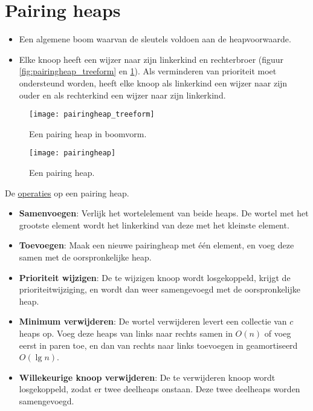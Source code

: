 \section{Pairing heaps}
		\begin{itemize}
			\item Een algemene boom waarvan de sleutels voldoen aan de heapvoorwaarde.
			\item Elke knoop heeft een wijzer naar zijn linkerkind en rechterbroer (figuur \ref{fig:pairingheap_treeform} en \ref{fig:pairingheap}). Als verminderen van prioriteit moet ondersteund worden, heeft elke knoop als linkerkind een wijzer naar zijn ouder en als rechterkind een wijzer naar zijn linkerkind.
		\end{itemize}
		\begin{figure}[ht]
			\centering
			\begin{minipage}{.5\textwidth}
				\centering
				\texttt{[image: pairingheap\_treeform]}
				\caption{Een pairing heap in boomvorm.}
				\label{fig:pairingheap_treeform}
			\end{minipage}%
			\begin{minipage}{.5\textwidth}
				\centering
				\texttt{[image: pairingheap]}
				\caption{Een pairing heap.}
				\label{fig:pairingheap}
			\end{minipage}

	
		\end{figure}

		De \underline{operaties} op een pairing heap.
		\begin{itemize}
			\item \textbf{Samenvoegen}: Verlijk het wortelelement van beide heaps. De wortel met het grootste element wordt het linkerkind van deze met het kleinste element.
			\item \textbf{Toevoegen}: Maak een nieuwe pairingheap met één element, en voeg deze samen met de oorspronkelijke heap.
			\item \textbf{Prioriteit wijzigen}: De te wijzigen knoop wordt losgekoppeld, krijgt de prioriteitwijziging, en wordt dan weer samengevoegd met de oorspronkelijke heap.
			\item \textbf{Minimum verwijderen}: De wortel verwijderen levert een collectie van $c$ heaps op. Voeg deze heaps van links naar rechts samen in $O(n)$ of voeg eerst in paren toe, en dan van rechts naar links toevoegen in geamortiseerd $O(\lg n)$.
			\item \textbf{Willekeurige knoop verwijderen}: De te verwijderen knoop wordt losgekoppeld, zodat er twee deelheaps onstaan. Deze twee deelheaps worden samengevoegd.
		\end{itemize}
